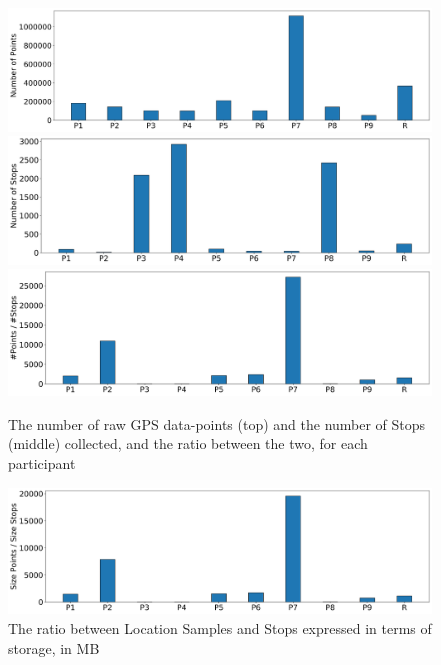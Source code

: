 \begin{figure}
    \centering
    \includegraphics[width=\textwidth]{images/study/storage/num_points.png}
    \includegraphics[width=\textwidth]{images/study/storage/num_stops.png}
    \includegraphics[width=\textwidth]{images/study/storage/compression_N.png}
    \caption{The number of raw GPS data-points (top) and the number of Stops (middle) collected, and the ratio between the two, for each participant}
    \label{fig:plot-num-points-stops}
\end{figure}

\begin{figure}
    \centering
    \includegraphics[width=\textwidth]{images/study/storage/compression_mb.png}
    \caption{The ratio between Location Samples and Stops expressed in terms of storage, in MB}
    \label{fig:plot-num-points-stops}
\end{figure}

